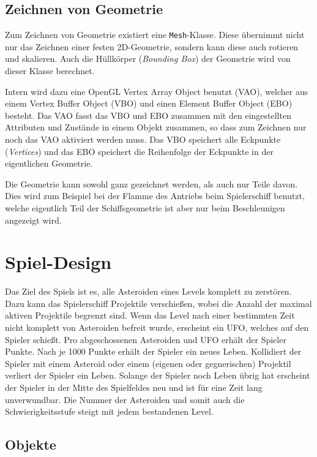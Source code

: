 \documentclass[12pt, a4paper, titlepage, hidelinks]{scrreprt}
\begin{document}
\subsection{Zeichnen von Geometrie}

Zum Zeichnen von Geometrie existiert eine \texttt{Mesh}-Klasse. Diese übernimmt nicht nur das Zeichnen einer festen 2D-Geometrie, sondern kann diese auch rotieren und skalieren. Auch die Hüllkörper (\textit{Bounding Box}) der Geometrie wird von dieser Klasse berechnet.

Intern wird dazu eine OpenGL Vertex Array Object benutzt (VAO), welcher aus einem Vertex Buffer Object (VBO) und einen Element Buffer Object (EBO) besteht. Das VAO fasst das VBO und EBO zusammen mit den eingestellten Attributen und Zustände in einem Objekt zusammen, so dass zum Zeichnen nur noch das VAO aktiviert werden muss. Das VBO speichert alle Eckpunkte (\textit{Vertices}) und das EBO speichert die Reihenfolge der Eckpunkte in der eigentlichen Geometrie.

Die Geometrie kann sowohl ganz gezeichnet werden, als auch nur Teile davon. Dies wird zum Beispiel bei der Flamme des Antriebs beim Spielerschiff benutzt, welche eigentlich Teil der Schiffsgeometrie ist aber nur beim Beschleunigen angezeigt wird.

\section{Spiel-Design}

Das Ziel des Spiels ist es, alle Asteroiden eines Levels komplett zu zerstören. Dazu kann das Spielerschiff Projektile verschießen, wobei die Anzahl der maximal aktiven Projektile begrenzt sind. Wenn das Level nach einer bestimmten Zeit nicht komplett von Asteroiden befreit wurde, erscheint ein UFO, welches auf den Spieler schießt. Pro abgeschossenen Asteroiden und UFO erhält der Spieler Punkte. Nach je 1000 Punkte erhält der Spieler ein neues Leben. Kollidiert der Spieler mit einem Asteroid oder einem (eigenen oder gegnerischen) Projektil verliert der Spieler ein Leben. Solange der Spieler noch Leben übrig hat erscheint der Spieler in der Mitte des Spielfeldes neu und ist für eine Zeit lang unverwundbar. Die Nummer der Asteroiden und somit auch die Schwierigkeitsstufe steigt mit jedem bestandenen Level.

\subsection{Objekte}
\end{document}
